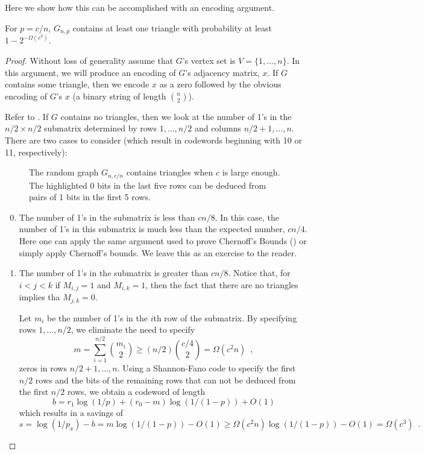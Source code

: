 \documentclass{patmorin}
\begin{document}
Here we show how this can be accomplished with an encoding argument.

\begin{thm}
  For $p=c/n$, $G_{n,p}$ contains at least one triangle with probability
  at least $1-2^{-\Omega(c^3)}$.
\end{thm}

\begin{proof}
   Without loss of generality assume that $G$'s vertex set is
   $V=\{1,\ldots,n\}$.  In this argument, we will produce an encoding
   of $G$'s adjacency matrix, $x$.  If $G$ contains some triangle, then
   we encode $x$ as a zero followed by the obvious encoding of $G$'s $x$
   (a binary string of length $\binom{n}{2}$).

   Refer to .  If $G$ contains no triangles, then we
   look at the number of 1's in the $n/2\times n/2$ submatrix determined
   by rows $1,\ldots,n/2$ and columns $n/2+1,\ldots,n$.  There are two
   cases to consider (which result in codewords beginning with 10 or 11,
   respectively):

   \begin{figure}
     \caption{The random graph $G_{n,c/n}$ contains triangles when $c$ is
       large enough.  The highlighted 0 bits in the last five rows can
       be deduced from pairs of 1 bits in the first 5 rows.}
   \end{figure}

   \begin{enumerate}\setcounter{enumi}{-1}
     \item The number of 1's in the submatrix is less than $cn/8$.
      In this case, the number of 1's in this submatrix is much less than
      the expected number, $cn/4$.  Here one can apply the same argument
      used to prove Chernoff's Bounds () or simply
      apply Chernoff's bounds. We leave this as an exercise to the reader.

     \item The number of 1's in the submatrix is greater than $cn/8$.
      Notice that, for $i<j<k$ if $M_{i,j}=1$ and $M_{i,k}=1$, then the
      fact that there are no triangles implies tha $M_{j,k}=0$.

      Let $m_i$ be the number of 1's in the $i$th row of the submatrix.
      By specifying rows $1,\ldots,n/2$, we eliminate the need to specify
      \[
          m = \sum_{i=1}^{n/2}\binom{m_i}{2} \ge (n/2)\binom{c/4}{2} = \Omega(c^2n) \enspace ,
      \]
      zeros in rows $n/2+1,\ldots,n$.
      Using a Shannon-Fano code to specify the first $n/2$ rows and the bits of the remaining rows that can not be deduced from the first $n/2$ rows, we obtain a codeword of length 
      \[
          b = r_1\log(1/p) + (r_0-m)\log(1/(1-p))  + O(1)
      \]
      which results in a savings of
      \[
          s = \log(1/p_x) - b = m\log(1/(1-p)) -O(1) \ge \Omega(c^2n)\log(1/(1-p)) - O(1) = \Omega(c^3) \enspace .
      \]
   \end{enumerate}
\end{proof}
\end{document}
